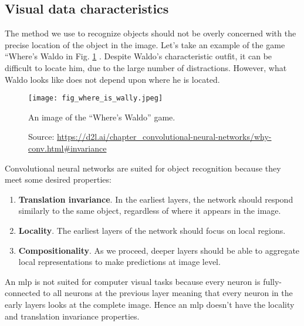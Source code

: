 \subsection{Visual data characteristics}
The method we use to recognize objects should not be overly concerned with the precise location of the object in the image. Let's take an example of the game “Where’s Waldo in Fig. \ref{fig:where_is_wally} \cite{zhang2021dive}. Despite Waldo's characteristic outfit, it can be difficult to locate him, due to the large number of distractions. However, what Waldo looks like does not depend upon where he is located. 
\begin{figure}[ht]
    \begin{center}       
    \texttt{[image: fig\_where\_is\_wally.jpeg]}
    \caption[An image of the “Where’s Waldo” game]{An image of the “Where’s Waldo” game.}
    \caption*{Source: \href{https://d2l.ai/chapter\_convolutional-neural-networks/why-conv.html\#invariance}{https://d2l.ai/chapter\_convolutional-neural-networks/why-conv.html\#invariance}}
    \label{fig:where_is_wally}
    \end{center}
\end{figure}

Convolutional neural networks are suited for object recognition because they meet some desired properties:
\begin{enumerate}
    \item \textbf{Translation invariance}. In the earliest layers, the network should respond similarly to the same object, regardless of where it appears in the image. 
    \item \textbf{Locality}. The earliest layers of the network should focus on local regions.
    \item \textbf{Compositionality}. As we proceed, deeper layers should be able to aggregate local representations to make predictions at image level.
\end{enumerate}

An \acrshort{mlp} is not suited for computer visual tasks because every neuron is fully-connected to all neurons at the previous layer meaning that every neuron in the early layers looks at the complete image. Hence an \acrshort{mlp} doesn't have the locality and translation invariance properties.

